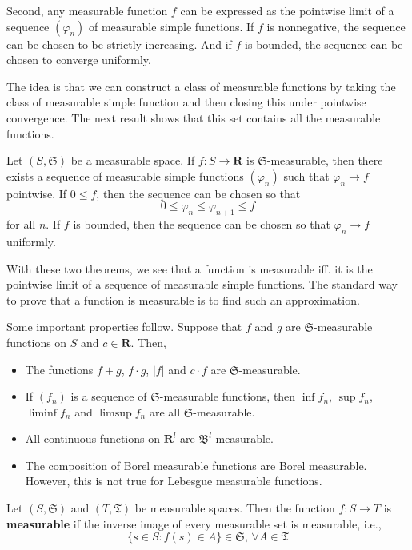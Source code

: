 Second, any measurable function $f$ can be expressed as the pointwise limit of a sequence $(\varphi_n)$ of measurable simple functions. If $f$ is nonnegative, the sequence can be chosen to be strictly increasing. And if $f$ is bounded, the sequence can be chosen to converge uniformly.

The idea is that we can construct a class of measurable functions by taking the class of measurable simple function and then closing this under pointwise convergence. The next result shows that this set contains all the measurable functions.

\begin{theorem}
	Let $(S, \mathfrak{S})$ be a measurable space. If $f : S \longrightarrow \textbf{R}$ is $\mathfrak{S}$-measurable, then there exists a sequence of measurable simple functions $(\varphi_n)$ such that $\varphi_n \longrightarrow f$ pointwise. If $0 \leq f$, then the sequence can be chosen so that 
	\[
		0 \leq \varphi_n \leq \varphi_{n+1} \leq f
	\]
	for all $n$. If $f$ is bounded, then the sequence can be chosen so that $\varphi_n \longrightarrow f$ uniformly.
\end{theorem}

With these two theorems, we see that a function is measurable iff. it is the pointwise limit of a sequence of measurable simple functions. The standard way to prove that a function is measurable is to find such an approximation.

Some important properties follow. Suppose that $f$ and $g$ are $\mathfrak{S}$-measurable functions on $S$ and $c \in \textbf{R}$. Then,
\begin{itemize}
	\item The functions $f + g$, $f \cdot g$, $|f|$ and $c \cdot f$ are $\mathfrak{S}$-measurable.
	\item If $(f_n)$ is a sequence of $\mathfrak{S}$-measurable functions, then $\inf f_n$, $\sup f_n$, $\liminf f_n$ and $\limsup f_n$ are all $\mathfrak{S}$-measurable.
	\item All continuous functions on $\textbf{R}^l$ are $\mathfrak{B}^l$-measurable.
	\item The composition of Borel measurable functions are Borel measurable. However, this is not true for Lebesgue measurable functions.
\end{itemize}

\begin{definition}
	Let $(S, \mathfrak{S})$ and $(T, \mathfrak{T})$ be measurable spaces. Then the function $f : S \longrightarrow T$ is \textbf{measurable} if the inverse image of every measurable set is measurable, i.e., 
	\[
		\{ s \in S : f(s) \in A \} \in \mathfrak{S}, \, \forall A \in \mathfrak{T}
	\]
\end{definition}

